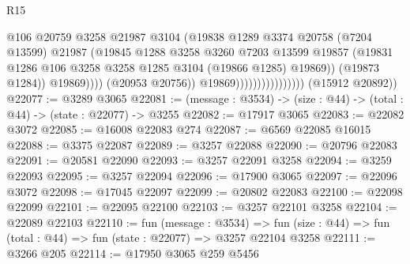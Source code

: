 \begin{lexlean}{R15}
\begin{coremodule}
                                                @106
                                                @20759
                                                @3258
                                                @21987
                                                @3104
                                                (@19838
                                                  @1289
                                                  @3374
                                                  @20758
                                                  (@7204 @13599)
                                                  @21987
                                                  (@19845
                                                    @1288
                                                    @3258
                                                    @3260
                                                    @7203
                                                    @13599
                                                    @19857
                                                    (@19831
                                                      @1286
                                                      @106
                                                      @3258
                                                      @3258
                                                      @1285
                                                      @3104
                                                      (@19866 @1285)
                                                      @19869))
                                                  (@19873 @1284))
                                                @19869))))
                                        (@20953 @20756))
                                      @19869))))))))))))))))
      (@15912 @20892))
@22077 := @3289 @3065
@22081 := (message : @3534) -> (size : @44) -> (total : @44) -> (state : @22077) -> @3255
@22082 := @17917 @3065
@22083 := @22082 @3072
@22085 := @16008 @22083 @274
@22087 := @6569 @22085 @16015
@22088 := @3375 @22087
@22089 := @3257 @22088
@22090 := @20796 @22083
@22091 := @20581 @22090
@22093 := @3257 @22091 @3258
@22094 := @3259 @22093
@22095 := @3257 @22094
@22096 := @17900 @3065
@22097 := @22096 @3072
@22098 := @17045 @22097
@22099 := @20802 @22083
@22100 := @22098 @22099
@22101 := @22095 @22100
@22103 := @3257 @22101 @3258
@22104 := @22089 @22103
@22110 := fun (message : @3534) =>
  fun (size : @44) => fun (total : @44) => fun (state : @22077) => @3257 @22104 @3258
@22111 := @3266 @205
@22114 := @17950 @3065 @259 @5456

\end{coremodule}
\end{lexlean}
